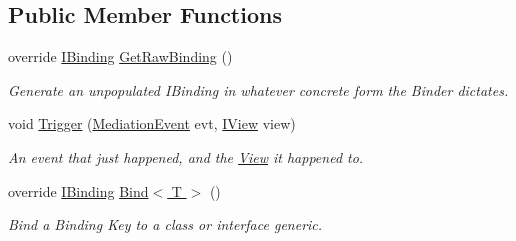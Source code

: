 \subsection*{Public Member Functions}
\begin{DoxyCompactItemize}
\item 
\hypertarget{classstrange_1_1extensions_1_1mediation_1_1impl_1_1_mediation_binder_a8979dac1fe07f85a453ecb0b43cd9c48}{override \hyperlink{interfacestrange_1_1framework_1_1api_1_1_i_binding}{I\-Binding} \hyperlink{classstrange_1_1extensions_1_1mediation_1_1impl_1_1_mediation_binder_a8979dac1fe07f85a453ecb0b43cd9c48}{Get\-Raw\-Binding} ()}\label{classstrange_1_1extensions_1_1mediation_1_1impl_1_1_mediation_binder_a8979dac1fe07f85a453ecb0b43cd9c48}

\begin{DoxyCompactList}\small\item\em Generate an unpopulated I\-Binding in whatever concrete form the Binder dictates. \end{DoxyCompactList}\item 
void \hyperlink{classstrange_1_1extensions_1_1mediation_1_1impl_1_1_mediation_binder_a239e22ae10b9abac39d32533771457f8}{Trigger} (\hyperlink{namespacestrange_1_1extensions_1_1mediation_1_1api_ae5a81bb1edf9fca1d2aca9f4fada72a8}{Mediation\-Event} evt, \hyperlink{interfacestrange_1_1extensions_1_1mediation_1_1api_1_1_i_view}{I\-View} view)
\begin{DoxyCompactList}\small\item\em An event that just happened, and the \hyperlink{classstrange_1_1extensions_1_1mediation_1_1impl_1_1_view}{View} it happened to. \end{DoxyCompactList}\item 
\hypertarget{classstrange_1_1extensions_1_1mediation_1_1impl_1_1_mediation_binder_a09f66b1d01dca93a0bad43c83d6c03cb}{override \hyperlink{interfacestrange_1_1framework_1_1api_1_1_i_binding}{I\-Binding} \hyperlink{classstrange_1_1extensions_1_1mediation_1_1impl_1_1_mediation_binder_a09f66b1d01dca93a0bad43c83d6c03cb}{Bind$<$ T $>$} ()}\label{classstrange_1_1extensions_1_1mediation_1_1impl_1_1_mediation_binder_a09f66b1d01dca93a0bad43c83d6c03cb}

\begin{DoxyCompactList}\small\item\em Bind a Binding Key to a class or interface generic. \end{DoxyCompactList}\end{DoxyCompactItemize}
